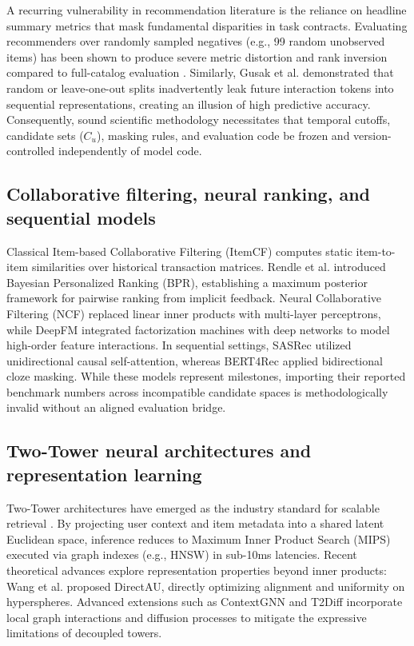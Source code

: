 \documentclass[10pt,a4paper]{article}
\begin{document}
A recurring vulnerability in recommendation literature is the reliance on headline summary metrics that mask fundamental disparities in task contracts. Evaluating recommenders over randomly sampled negatives (e.g., 99 random unobserved items) has been shown to produce severe metric distortion and rank inversion compared to full-catalog evaluation \cite{petrov2022_a_systematic_review_and_replicability_study_of_bert4rec_fo}. Similarly, Gusak et al. \cite{gusak2025_time_split} demonstrated that random or leave-one-out splits inadvertently leak future interaction tokens into sequential representations, creating an illusion of high predictive accuracy. Consequently, sound scientific methodology necessitates that temporal cutoffs, candidate sets ($C_u$), masking rules, and evaluation code be frozen and version-controlled independently of model code.

\subsection{Collaborative filtering, neural ranking, and sequential models}

Classical Item-based Collaborative Filtering (ItemCF) \cite{sarwar2001_itemcf} computes static item-to-item similarities over historical transaction matrices. Rendle et al. \cite{rendle2009_bpr} introduced Bayesian Personalized Ranking (BPR), establishing a maximum posterior framework for pairwise ranking from implicit feedback. Neural Collaborative Filtering (NCF) \cite{he2017_ncf} replaced linear inner products with multi-layer perceptrons, while DeepFM \cite{guo2017_deepfm} integrated factorization machines with deep networks to model high-order feature interactions. In sequential settings, SASRec \cite{kang2018_sasrec} utilized unidirectional causal self-attention, whereas BERT4Rec \cite{sun2019_bert4rec} applied bidirectional cloze masking. While these models represent milestones, importing their reported benchmark numbers across incompatible candidate spaces is methodologically invalid without an aligned evaluation bridge.

\subsection{Two-Tower neural architectures and representation learning}

Two-Tower architectures have emerged as the industry standard for scalable retrieval \cite{covington2016_youtube, yi2019_ndr}. By projecting user context and item metadata into a shared latent Euclidean space, inference reduces to Maximum Inner Product Search (MIPS) executed via graph indexes (e.g., HNSW) in sub-10ms latencies. Recent theoretical advances explore representation properties beyond inner products: Wang et al. \cite{wang2022_directau} proposed DirectAU, directly optimizing alignment and uniformity on hyperspheres. Advanced extensions such as ContextGNN \cite{yuan2025_contextgnn} and T2Diff \cite{wang2025_t2diff} incorporate local graph interactions and diffusion processes to mitigate the expressive limitations of decoupled towers.
\end{document}
